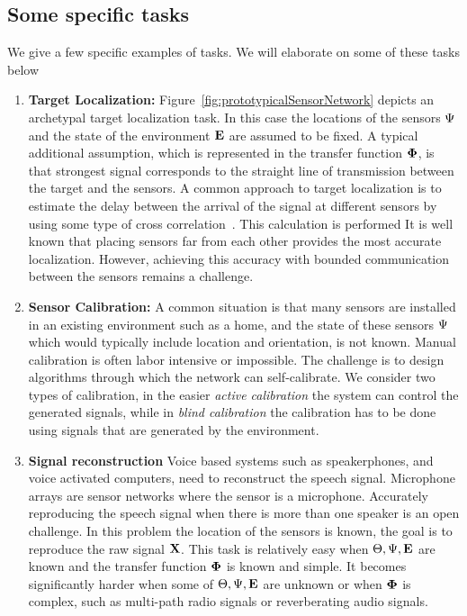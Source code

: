 \subsection{Some specific tasks}\label{sec:examples}
We give a few specific examples of tasks. We will elaborate on some of these tasks below
\begin{enumerate}
    \item {\bf Target Localization:}
      Figure~\ref{fig:prototypicalSensorNetwork} depicts an archetypal
      target localization task. In this case the locations of the
      sensors $\Psi$ and the state of the environment $\mathbf{E}$ are
      assumed to be fixed. A typical additional assumption, which is
      represented in the transfer function $\mathbf{\Phi}$, is that
      strongest signal corresponds to the straight line of
      transmission between the target and the sensors. A common
      approach to target localization is to estimate the delay between
      the arrival of the signal at different sensors by using some
      type of cross correlation~\cite{}. This calculation is performed  
      It is well known that placing sensors far from each other
      provides the most accurate localization. However, achieving this
      accuracy with bounded communication between the sensors remains
      a challenge.

    \item{\bf Sensor Calibration:} A common situation is that many sensors
      are installed in an existing environment such as a home, and
      the state of these sensors $\Psi$ which would typically
      include location and orientation, is not known. Manual
      calibration is often labor intensive or impossible. The
      challenge is to design algorithms through which the network can
      self-calibrate. We consider two types of calibration, in the
      easier {\em active calibration} the system can control the generated
      signals, while in {\em blind calibration} the calibration has to
      be done using signals that are generated by the environment. 
      
    \item {\bf Signal reconstruction} Voice based systems such as
      speakerphones, and voice activated computers, need to
      reconstruct the speech signal. Microphone arrays are sensor
      networks where the sensor is a microphone. Accurately
      reproducing the speech signal when there is more than one
      speaker is an open challenge. In this problem the location of
      the sensors is known, the goal is to reproduce the raw signal
      $\mathbf{X}$. This task is relatively easy when
      $\Theta,\Psi,\mathbf{E}$ are known and the transfer function
      $\mathbf{\Phi}$ is known and simple. It becomes significantly harder
      when some of $\Theta,\Psi,\mathbf{E}$ are unknown or when
      $\mathbf{\Phi}$ is complex, such as multi-path radio signals or
      reverberating audio signals.
    

\end{enumerate}
